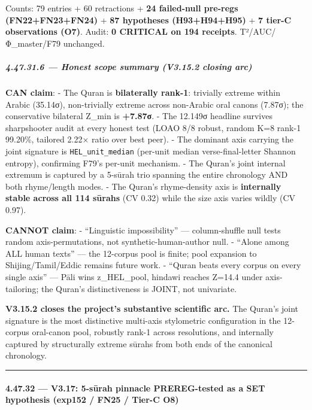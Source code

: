 \documentclass[
]{article}
\begin{document}
Counts: 79 entries + 60 retractions + \textbf{24 failed-null pre-regs
(FN22+FN23+FN24)} + \textbf{87 hypotheses (H93+H94+H95)} + \textbf{7
tier-C observations (O7)}. Audit: \textbf{0 CRITICAL on 194 receipts}.
T²/AUC/Φ\_master/F79 unchanged.

\subparagraph{4.47.31.6 --- Honest scope summary (V3.15.2 closing
arc)}\label{honest-scope-summary-v3.15.2-closing-arc}

\textbf{CAN claim}: - The Quran is \textbf{bilaterally rank-1}:
trivially extreme within Arabic (35.14σ), non-trivially extreme across
non-Arabic oral canons (7.87σ); the conservative bilateral Z\_min is
\textbf{+7.87σ}. - The 12.149σ headline survives sharpshooter audit at
every honest test (LOAO 8/8 robust, random K=8 rank-1 99.20\%, tailored
2.22× ratio over best peer). - The dominant axis carrying the joint
signature is \texttt{HEL\_unit\_median} (per-unit median
verse-final-letter Shannon entropy), confirming F79's per-unit
mechanism. - The Quran's joint internal extremum is captured by a
5-sūrah trio spanning the entire chronology AND both rhyme/length modes.
- The Quran's rhyme-density axis is \textbf{internally stable across all
114 sūrahs} (CV 0.32) while the size axis varies wildly (CV 0.97).

\textbf{CANNOT claim}: - ``Linguistic impossibility'' --- column-shuffle
null tests random axis-permutations, not synthetic-human-author null. -
``Alone among ALL human texts'' --- the 12-corpus pool is finite; pool
expansion to Shijing/Tamil/Eddic remains future work. - ``Quran beats
every corpus on every single axis'' --- Pāli wins z\_HEL\_pool, hindawi
reaches Z=14.4 under axis-tailoring; the Quran's distinctiveness is
JOINT, not univariate.

\textbf{V3.15.2 closes the project's substantive scientific arc.} The
Quran's joint signature is the most distinctive multi-axis stylometric
configuration in the 12-corpus oral-canon pool, robustly rank-1 across
resolutions, and internally captured by structurally extreme sūrahs from
both ends of the canonical chronology.

\begin{center}\rule{0.5\linewidth}{0.5pt}\end{center}

\paragraph{4.47.32 --- V3.17: 5-sūrah pinnacle PREREG-tested as a SET
hypothesis (exp152 / FN25 / Tier-C
O8)}\label{v3.17-5-sux16brah-pinnacle-prereg-tested-as-a-set-hypothesis-exp152-fn25-tier-c-o8}
\end{document}
